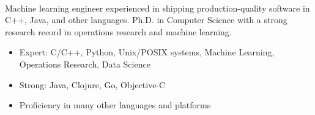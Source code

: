 \documentclass[a4paper,10pt]{cvclean}
\begin{document}
\setmainfont[Mapping=tex-text]{Cambria}
\makeheader



\begin{Summary}\\[1em]
\makebox[0.3in]{}
\parbox{\textwidth-0.3in}{Machine learning engineer experienced in shipping
  production-quality software in C++, Java, and other languages. Ph.D. in Computer
  Science with a strong research record in operations research and machine learning.}
\end{Summary}


\begin{Highlights}
\begin{itemize} 
\item Expert: C/C++, Python, Unix/POSIX systems, Machine Learning, Operations Research, Data Science
\item Strong: Java, Clojure, Go, Objective-C
\item Proficiency in many other languages and platforms
\end{itemize}
\end{Highlights}




  
\end{document}
